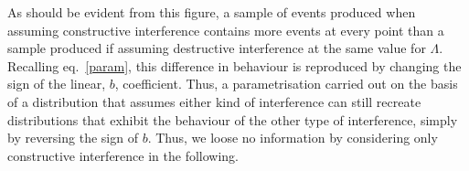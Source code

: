 \begin{edits}
As should be evident from this figure, a sample of events produced when assuming constructive interference contains more events at every point than a sample produced if assuming destructive interference at the same value for $\Lambda$. 
Recalling eq.~\eqref{param}, this difference in behaviour is reproduced by changing the sign of the linear, $b$, coefficient. Thus, a parametrisation carried out on the basis of a distribution that assumes either kind of interference can still recreate distributions that exhibit the behaviour of the other type of interference, simply by reversing the sign of $b$. Thus, we loose no information by considering only constructive interference in the following.
\end{edits}



